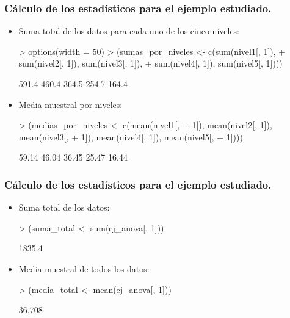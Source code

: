 \begin{frame}[fragile]
\frametitle{Cálculo de los estadísticos para el ejemplo estudiado.}
\begin{itemize}
\item<2-> Suma total de los datos para cada uno de los cinco niveles:

\begin{Schunk}
\begin{Sinput}
> options(width = 50)
> (sumas_por_niveles <- c(sum(nivel1[, 1]), 
+     sum(nivel2[, 1]), sum(nivel3[, 1]), 
+     sum(nivel4[, 1]), sum(nivel5[, 1])))
\end{Sinput}
\begin{Soutput}
[1] 591.4 460.4 364.5 254.7 164.4
\end{Soutput}
\end{Schunk}

\item<3-> Media muestral por niveles:

\begin{Schunk}
\begin{Sinput}
> (medias_por_niveles <- c(mean(nivel1[, 
+     1]), mean(nivel2[, 1]), mean(nivel3[, 
+     1]), mean(nivel4[, 1]), mean(nivel5[, 
+     1])))
\end{Sinput}
\begin{Soutput}
[1] 59.14 46.04 36.45 25.47 16.44
\end{Soutput}
\end{Schunk}

\end{itemize}
\end{frame}
\begin{frame}[fragile]
\frametitle{Cálculo de los estadísticos para el ejemplo estudiado.}
\begin{itemize}
\item<2-> Suma total de los datos:
{

\begin{Schunk}
\begin{Sinput}
> (suma_total <- sum(ej_anova[, 1]))
\end{Sinput}
\begin{Soutput}
[1] 1835.4
\end{Soutput}
\end{Schunk}

}
\item<3-> Media muestral de todos los datos:
{
\begin{Schunk}
\begin{Sinput}
> (media_total <- mean(ej_anova[, 1]))
\end{Sinput}
\begin{Soutput}
[1] 36.708
\end{Soutput}
\end{Schunk}

}
\end{itemize}
\end{frame}
